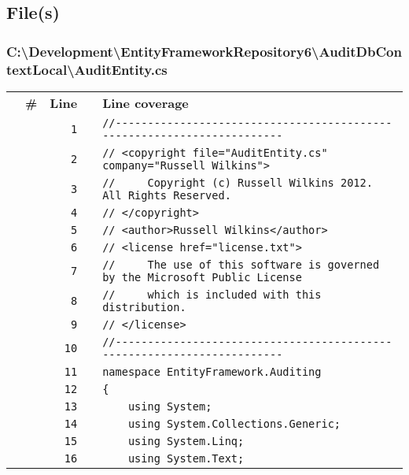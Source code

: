 \documentclass[a4paper,10pt]{article}
\begin{document}
\subsection{File(s)}
\subsubsection{C:\textbackslash Development\textbackslash EntityFrameworkRepository6\textbackslash AuditDbContextLocal\textbackslash AuditEntity.cs}
\begin{longtable}[l]{lrrll}
\textbf{} & \textbf{\#} & \textbf{Line} & \textbf{} & \textbf{Line coverage}\\
\cellcolor{gray} &  & \verb~1~ & & \verb~//-----------------------------------------------------------------------~\\
\cellcolor{gray} &  & \verb~2~ & & \verb~// <copyright file="AuditEntity.cs" company="Russell Wilkins">~\\
\cellcolor{gray} &  & \verb~3~ & & \verb~//     Copyright (c) Russell Wilkins 2012. All Rights Reserved.~\\
\cellcolor{gray} &  & \verb~4~ & & \verb~// </copyright>~\\
\cellcolor{gray} &  & \verb~5~ & & \verb~// <author>Russell Wilkins</author>~\\
\cellcolor{gray} &  & \verb~6~ & & \verb~// <license href="license.txt">~\\
\cellcolor{gray} &  & \verb~7~ & & \verb~//     The use of this software is governed by the Microsoft Public License~\\
\cellcolor{gray} &  & \verb~8~ & & \verb~//     which is included with this distribution.~\\
\cellcolor{gray} &  & \verb~9~ & & \verb~// </license>~\\
\cellcolor{gray} &  & \verb~10~ & & \verb~//-----------------------------------------------------------------------~\\
\cellcolor{gray} &  & \verb~11~ & & \verb~namespace EntityFramework.Auditing~\\
\cellcolor{gray} &  & \verb~12~ & & \verb~{~\\
\cellcolor{gray} &  & \verb~13~ & & \verb~    using System;~\\
\cellcolor{gray} &  & \verb~14~ & & \verb~    using System.Collections.Generic;~\\
\cellcolor{gray} &  & \verb~15~ & & \verb~    using System.Linq;~\\
\cellcolor{gray} &  & \verb~16~ & & \verb~    using System.Text;~\\

\end{longtable}
\end{document}
